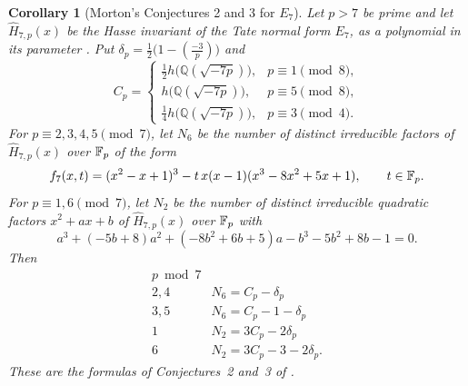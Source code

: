 \documentclass[11pt,a4paper]{article}
\newtheorem{corollary}[theorem]{Corollary}
\theoremstyle{remark}\newtheorem{remark}[theorem]{Remark}
\numberwithin{equation}{section}
\newcommand{\Q}{\mathbb Q}\newcommand{\Z}{\mathbb Z}
\newcommand{\leg}[2]{\left(\frac{#1}{#2}\right)}
\newcommand{\hK}[1]{h\bigl(\Q(\sqrt{-#1})\bigr)}
\begin{document}
\begin{corollary}[Morton's Conjectures 2 and 3 for $E_7$]\label{cor:morton-E7}
	Let $p>7$ be prime and let $\widehat H_{7,p}(x)$ be the Hasse invariant of the Tate normal form $E_7$, as a polynomial in its parameter \cite{Morton7}. Put $\delta_p=\tfrac12\bigl(1-\leg{-3}{p}\bigr)$ and
	\[
	C_p=\begin{cases}
		\tfrac12\hK{7p},&p\equiv1\pmod8,\\
		\hK{7p},&p\equiv5\pmod8,\\
		\tfrac14\hK{7p},&p\equiv3\pmod4.
	\end{cases}
	\]
	For $p\equiv2,3,4,5\pmod7$, let $N_6$ be the number of distinct irreducible factors of $\widehat H_{7,p}(x)$ over $\mathbb F_p$ of the form
	\[
	f_7(x,t)=(x^2-x+1)^3-t\,x(x-1)(x^3-8x^2+5x+1),\qquad t\in\mathbb F_p.
	\]
	For $p\equiv1,6\pmod7$, let $N_2$ be the number of distinct irreducible quadratic factors $x^2+ax+b$ of $\widehat H_{7,p}(x)$ over $\mathbb F_p$ with
	\[
	a^3+(-5b+8)a^2+(-8b^2+6b+5)a-b^3-5b^2+8b-1=0.
	\]
	Then
	\[
	\begin{array}{c|l}
		p\bmod7&\\\hline
		2,4&N_6=C_p-\delta_p\\
		3,5&N_6=C_p-1-\delta_p\\
		1&N_2=3C_p-2\delta_p\\
		6&N_2=3C_p-3-2\delta_p.
	\end{array}
	\]
	These are the formulas of Conjectures~2 and~3 of \cite[Section~2]{Morton7}.
\end{corollary}
\end{document}
